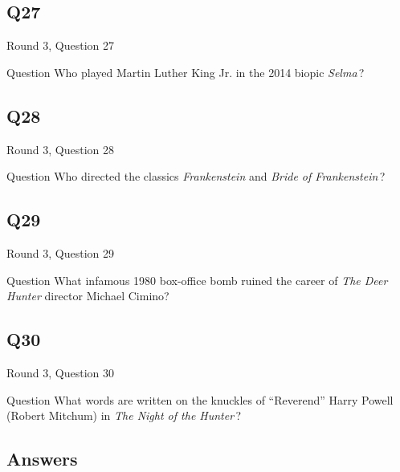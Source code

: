 \documentclass[11pt]{beamer}
\begin{document}
\subsection*{Q27}
\begin{frame}[t]{Round 3, Question 27}
\vspace{2em}
\begin{block}{Question}
Who played Martin Luther King Jr. in the 2014 biopic \emph{Selma}\,?
\end{block}
\end{frame}
    

\subsection*{Q28}
\begin{frame}[t]{Round 3, Question 28}
\vspace{2em}
\begin{block}{Question}
Who directed the classics \emph{Frankenstein} and \emph{Bride of Frankenstein}\,?
\end{block}
\end{frame}
    

\subsection*{Q29}
\begin{frame}[t]{Round 3, Question 29}
\vspace{2em}
\begin{block}{Question}
What infamous 1980 box-office bomb ruined the career of \emph{The Deer Hunter} director Michael Cimino?
\end{block}
\end{frame}
    

\subsection*{Q30}
\begin{frame}[t]{Round 3, Question 30}
\vspace{2em}
\begin{block}{Question}
What words are written on the knuckles of ``Reverend'' Harry Powell (Robert Mitchum) in \emph{The Night of the Hunter}\,?
\end{block}
\end{frame}
    
\subsection{Answers}
\end{document}
